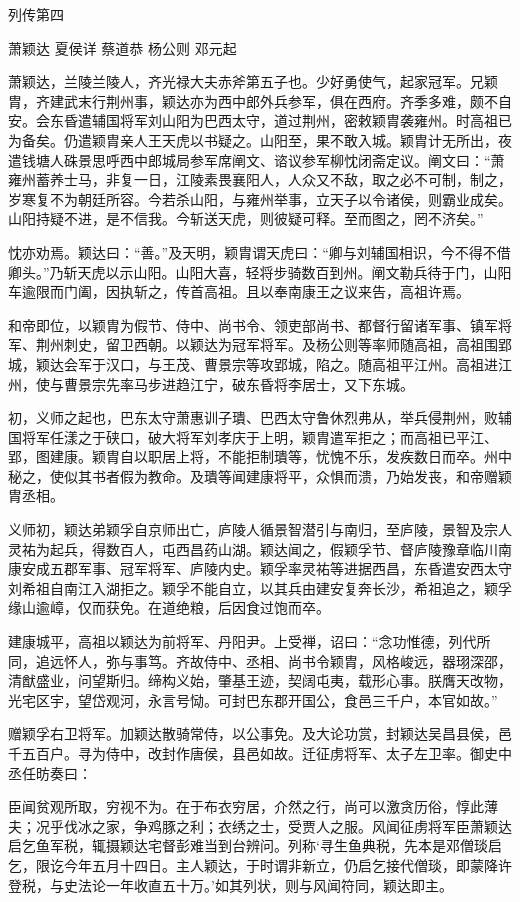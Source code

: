 \documentclass[12pt,UTF8]{ctexbook}
\begin{document}
列传第四

萧颖达 夏侯详 蔡道恭 杨公则 邓元起

萧颖达，兰陵兰陵人，齐光禄大夫赤斧第五子也。少好勇使气，起家冠军。兄颖胄，齐建武末行荆州事，颖达亦为西中郎外兵参军，俱在西府。齐季多难，颇不自安。会东昏遣辅国将军刘山阳为巴西太守，道过荆州，密敕颖胄袭雍州。时高祖已为备矣。仍遣颖胄亲人王天虎以书疑之。山阳至，果不敢入城。颖胄计无所出，夜遣钱塘人硃景思呼西中郎城局参军席阐文、谘议参军柳忱闭斋定议。阐文曰：“萧雍州蓄养士马，非复一日，江陵素畏襄阳人，人众又不敌，取之必不可制，制之，岁寒复不为朝廷所容。今若杀山阳，与雍州举事，立天子以令诸侯，则霸业成矣。山阳持疑不进，是不信我。今斩送天虎，则彼疑可释。至而图之，罔不济矣。”

忱亦劝焉。颖达曰：“善。”及天明，颖胄谓天虎曰：“卿与刘辅国相识，今不得不借卿头。”乃斩天虎以示山阳。山阳大喜，轻将步骑数百到州。阐文勒兵待于门，山阳车逾限而门阖，因执斩之，传首高祖。且以奉南康王之议来告，高祖许焉。

和帝即位，以颖胄为假节、侍中、尚书令、领吏部尚书、都督行留诸军事、镇军将军、荆州刺史，留卫西朝。以颖达为冠军将军。及杨公则等率师随高祖，高祖围郢城，颖达会军于汉口，与王茂、曹景宗等攻郢城，陷之。随高祖平江州。高祖进江州，使与曹景宗先率马步进趋江宁，破东昏将李居士，又下东城。

初，义师之起也，巴东太守萧惠训子璝、巴西太守鲁休烈弗从，举兵侵荆州，败辅国将军任漾之于硖口，破大将军刘孝庆于上明，颖胄遣军拒之；而高祖已平江、郢，图建康。颖胄自以职居上将，不能拒制璝等，忧愧不乐，发疾数日而卒。州中秘之，使似其书者假为教命。及璝等闻建康将平，众惧而溃，乃始发丧，和帝赠颖胄丞相。

义师初，颖达弟颖孚自京师出亡，庐陵人循景智潜引与南归，至庐陵，景智及宗人灵祐为起兵，得数百人，屯西昌药山湖。颖达闻之，假颖孚节、督庐陵豫章临川南康安成五郡军事、冠军将军、庐陵内史。颖孚率灵祐等进据西昌，东昏遣安西太守刘希祖自南江入湖拒之。颖孚不能自立，以其兵由建安复奔长沙，希祖追之，颖孚缘山逾嶂，仅而获免。在道绝粮，后因食过饱而卒。

建康城平，高祖以颖达为前将军、丹阳尹。上受禅，诏曰：“念功惟德，列代所同，追远怀人，弥与事笃。齐故侍中、丞相、尚书令颖胄，风格峻远，器珝深邵，清猷盛业，问望斯归。缔构义始，肇基王迹，契阔屯夷，载形心事。朕膺天改物，光宅区宇，望岱观河，永言号恸。可封巴东郡开国公，食邑三千户，本官如故。”

赠颖孚右卫将军。加颖达散骑常侍，以公事免。及大论功赏，封颖达吴昌县侯，邑千五百户。寻为侍中，改封作唐侯，县邑如故。迁征虏将军、太子左卫率。御史中丞任昉奏曰：

臣闻贫观所取，穷视不为。在于布衣穷居，介然之行，尚可以激贪历俗，惇此薄夫；况乎伐冰之家，争鸡豚之利；衣绣之士，受贾人之服。风闻征虏将军臣萧颖达启乞鱼军税，辄摄颖达宅督彭难当到台辨问。列称‘寻生鱼典税，先本是邓僧琰启乞，限讫今年五月十四日。主人颖达，于时谓非新立，仍启乞接代僧琰，即蒙降许登税，与史法论一年收直五十万。’如其列状，则与风闻符同，颖达即主。
\end{document}
